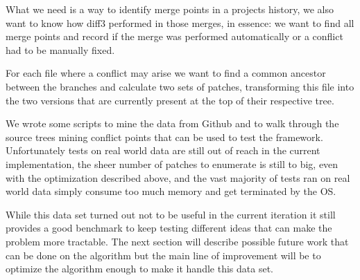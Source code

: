 \documentclass[11pt]{article}
\begin{document}
What we need is a way to identify merge points in a projects history, we also 
want to know how diff3 performed in those merges, in essence: we want to find all 
merge points and record if the merge was performed automatically or a conflict 
had to be manually fixed.

For each file where a conflict may arise we want to find a common ancestor 
between the branches and calculate two sets of patches, transforming this file 
into the two versions that are currently present at the top of their respective 
tree. 

We wrote some scripts to mine the data from Github and to walk through the 
source trees mining conflict points  that can be used to test the framework. 
Unfortunately tests on real world data are still out of reach in the current 
implementation, the sheer number of patches to enumerate is still to big, even 
with the optimization described above, and the vast majority of tests ran on 
real world data simply consume too much memory and get terminated by the OS.

While this data set turned out not to be useful in the current iteration it 
still provides a good benchmark to keep testing different ideas that can make 
the problem more tractable. The next section will describe possible future work 
that can be done on the algorithm but the main line of improvement will be to 
optimize the algorithm enough to make it handle this data set.
\end{document}
